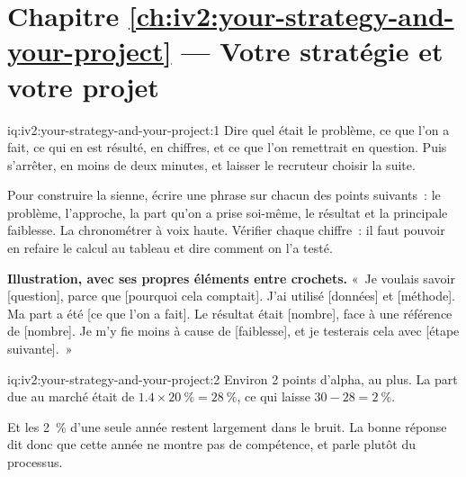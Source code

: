 \section*{Chapitre \ref{ch:iv2:your-strategy-and-your-project} --- Votre stratégie et votre projet}

\begin{solution}{iq:iv2:your-strategy-and-your-project:1}
Dire quel était le problème, ce que l'on a fait, ce qui en est résulté, en chiffres, et ce que l'on remettrait en question. Puis s'arrêter, en moins de deux minutes, et laisser le recruteur choisir la suite.

Pour construire la sienne, écrire une phrase sur chacun des points suivants~: le problème, l'approche, la part qu'on a prise soi-même, le résultat et la principale faiblesse. La chronométrer à voix haute. Vérifier chaque chiffre~: il faut pouvoir en refaire le calcul au tableau et dire comment on l'a testé.

\textbf{Illustration, avec ses propres éléments entre crochets.} «~Je voulais savoir [question], parce que [pourquoi cela comptait]. J'ai utilisé [données] et [méthode]. Ma part a été [ce que l'on a fait]. Le résultat était [nombre], face à une référence de [nombre]. Je m'y fie moins à cause de [faiblesse], et je testerais cela avec [étape suivante].~»

\end{solution}

\begin{solution}{iq:iv2:your-strategy-and-your-project:2}
Environ 2 points d'alpha, au plus. La part due au marché était de $1.4 \times 20~\% = 28~\%$, ce qui laisse $30 - 28 = 2~\%$.

Et les 2~\% d'une seule année restent largement dans le bruit. La bonne réponse dit donc que cette année ne montre pas de compétence, et parle plutôt du processus.

\end{solution}


